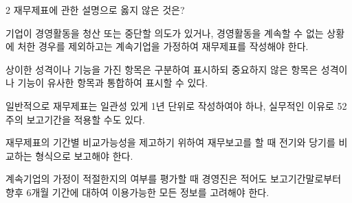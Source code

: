 \begin{question}{2}
재무제표에 관한 설명으로 옳지 않은 것은?
\begin{choices}
  \item 기업이 경영활동을 청산 또는 중단할 의도가 있거나, 경영활동을 계속할 수 없는 상황에 처한 경우를 제외하고는 계속기업을 가정하여 재무제표를 작성해야 한다.
  \item 상이한 성격이나 기능을 가진 항목은 구분하여 표시하되 중요하지 않은 항목은 성격이나 기능이 유사한 항목과 통합하여 표시할 수 있다.
  \item 일반적으로 재무제표는 일관성 있게 1년 단위로 작성하여야 하나, 실무적인 이유로 52주의 보고기간을 적용할 수도 있다.
  \item 재무제표의 기간별 비교가능성을 제고하기 위하여 재무보고를 할 때 전기와 당기를 비교하는 형식으로 보고해야 한다.
  \item 계속기업의 가정이 적절한지의 여부를 평가할 때 경영진은 적어도 보고기간말로부터 향후 6개월 기간에 대하여 이용가능한 모든 정보를 고려해야 한다.
\end{choices}
\end{question}
